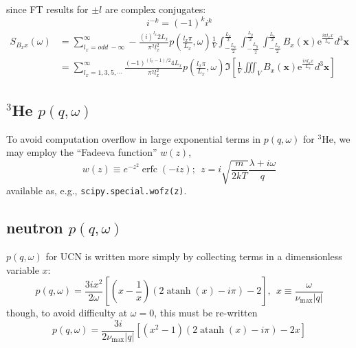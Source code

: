 \documentclass[11pt,english]{article}
\begin{document}
since FT results for $\pm l$ are complex conjugates:
\begin{equation}
	i^{-k} = (-1)^k i^k
\end{equation}
\begin{align}
S_{B_x x}(\omega) & = \sum_{l_x=odd~-\infty }^{\infty } -\frac{(i)^{l_x}2L_x}{\pi ^{2}l_x^{2}}
	p\left(\frac{l_x \pi}{L_x}, \omega \right)
	\frac{1}{V} \int_{-\frac{L_x}{2}}^{\frac{L_x}{2}}\int_{-\frac{L_y}{2}}^{\frac{L_y}{2}} \int_{-\frac{L_z}{2}}^{\frac{L_z}{2}}
	B_x(\mathbf{x} )\mathrm{e}^{\frac{i\pi l_x x}{L_x}}d^3\mathbf{x} \\
		& = \sum_{l_x = 1,3,5,\cdots}^{\infty} \frac{(-1)^{(l_x-1)/2} 4 L_x}{\pi ^{2}l_x^{2}}
	p\left(\frac{l_x \pi}{L_x}, \omega \right)
	\Im \left[ \frac{1}{V} \iiint_V
	B_x(\mathbf{x} )\mathrm{e}^{\frac{i\pi l_x x}{L_x}}d^3\mathbf{x} \right]
\end{align}

\subsection{$^3$He $p(q,\omega)$}

To avoid computation overflow in large exponential terms in $p(q,\omega)$ for $^3$He,
	we may employ the ``Fadeeva function'' $w(z)$,
\begin{equation}
	w(z) \equiv e^{-z^2} \operatorname{erfc}(-iz); \ \ z = i \sqrt{\frac{m}{2kT}} \frac{\lambda+i\omega}{q}
\end{equation}
available as, e.g., \texttt{scipy.special.wofz(z)}.

\subsection{neutron $p(q,\omega)$}
$p(q,\omega)$ for UCN is written more simply by collecting terms in a dimensionless variable $x$:
\begin{equation}
	p(q,\omega) = \frac{3ix^2}{2\omega} \left[ \left(x - \frac{1}{x}\right)(2\operatorname{atanh}(x)-i\pi) - 2 \right],\ \
	x \equiv \frac{\omega}{\nu_\textrm{max}|q|}
\end{equation}
though, to avoid difficulty at $\omega = 0$, this must be re-written
\begin{equation}
	p(q,\omega) = \frac{3i}{2\nu_\textrm{max}|q|} \left[ \left(x^2 - 1\right)(2\operatorname{atanh}(x)-i\pi) - 2x \right]
\end{equation}
\end{document}
